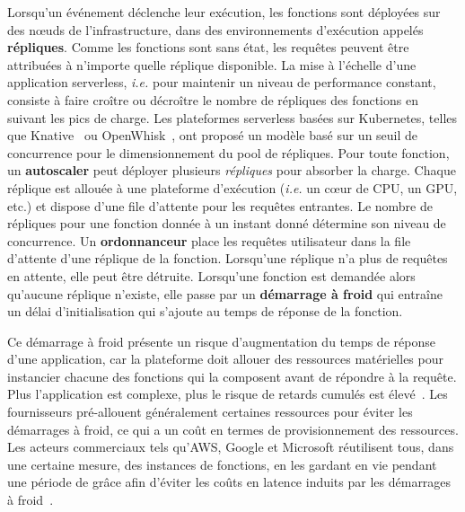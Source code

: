 Lorsqu'un événement déclenche leur exécution, les fonctions sont déployées sur des nœuds de l'infrastructure, dans des environnements d'exécution appelés \textbf{répliques}. Comme les fonctions sont sans état, les requêtes peuvent être attribuées à n'importe quelle réplique disponible. La mise à l'échelle d'une application serverless, \textit{i.e.} pour maintenir un niveau de performance constant, consiste à faire croître ou décroître le nombre de répliques des fonctions en suivant les pics de charge. Les plateformes serverless basées sur Kubernetes, telles que Knative~\cite{knative} ou OpenWhisk~\cite{openwhisk}, ont proposé un modèle basé sur un seuil de concurrence pour le dimensionnement du pool de répliques. Pour toute fonction, un \textbf{autoscaler} peut déployer plusieurs \textit{répliques} pour absorber la charge. Chaque réplique est allouée à une plateforme d'exécution (\textit{i.e.} un cœur de CPU, un GPU, etc.) et dispose d'une file d'attente pour les requêtes entrantes. Le nombre de répliques pour une fonction donnée à un instant donné détermine son niveau de concurrence. Un \textbf{ordonnanceur} place les requêtes utilisateur dans la file d'attente d'une réplique de la fonction. Lorsqu'une réplique n'a plus de requêtes en attente, elle peut être détruite. Lorsqu'une fonction est demandée alors qu'aucune réplique n'existe, elle passe par un \textbf{démarrage à froid} qui entraîne un délai d'initialisation qui s'ajoute au temps de réponse de la fonction.


Ce démarrage à froid présente un risque d'augmentation du temps de réponse d'une application, car la plateforme doit allouer des ressources matérielles pour instancier chacune des fonctions qui la composent avant de répondre à la requête. Plus l'application est complexe, plus le risque de retards cumulés est élevé~\cite{mohanAgileColdStartsa}. Les fournisseurs pré-allouent généralement certaines ressources pour éviter les démarrages à froid, ce qui a un coût en termes de provisionnement des ressources. Les acteurs commerciaux tels qu'AWS, Google et Microsoft réutilisent tous, dans une certaine mesure, des instances de fonctions, en les gardant en vie pendant une période de grâce afin d'éviter les coûts en latence induits par les démarrages à froid~\cite{vahidiniaColdStartServerless2020}.

